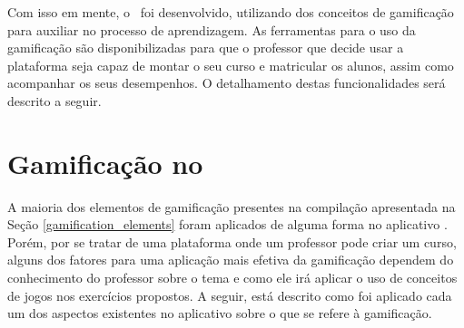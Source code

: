 Com isso em mente, o \appName\ foi desenvolvido, utilizando dos conceitos de gamificação para auxiliar no processo de aprendizagem. As ferramentas para o uso da gamificação são disponibilizadas para que o professor que decide usar a plataforma seja capaz de montar o seu curso e matricular os alunos, assim como acompanhar os seus desempenhos. O detalhamento destas funcionalidades será descrito a seguir.

\section{Gamificação no \appName}

A maioria dos elementos de gamificação presentes na compilação apresentada na Seção \ref{gamification_elements} foram aplicados de alguma forma no aplicativo \appName. Porém, por se tratar de uma plataforma onde um professor pode criar um curso, alguns dos fatores para uma aplicação mais efetiva da gamificação dependem do conhecimento do professor sobre o tema e como ele irá aplicar o uso de conceitos de jogos nos exercícios propostos. A seguir, está descrito como foi aplicado cada um dos aspectos existentes no aplicativo sobre o que se refere à gamificação.

